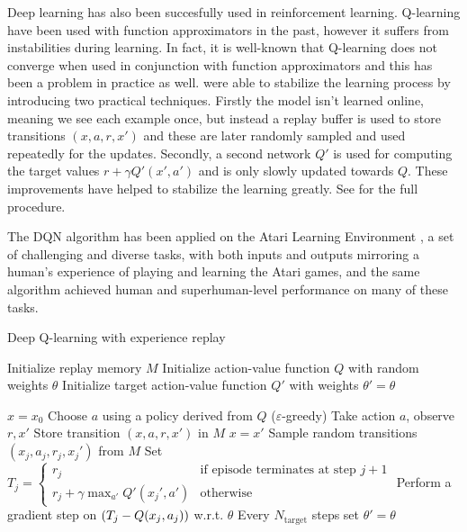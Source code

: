Deep learning has also been succesfully used in reinforcement learning. Q-learning have been used with function approximators in the past\cite{neco}, however it suffers from instabilities during learning. In fact, it is well-known that Q-learning does not converge when used in conjunction with function approximators \cite{...} and this has been a problem in practice as well. \citet{mnih2015human} were able to stabilize the learning process by introducing two practical techniques. Firstly the model isn't learned online, meaning we see each example once, but instead a replay buffer is used to store transitions $(x, a, r, x')$ and these are later randomly sampled and used repeatedly for the updates. Secondly, a second network $Q'$ is used for computing the target values $r + \gamma Q'(x', a')$ and is only slowly updated towards $Q$. These improvements have helped to stabilize the learning greatly. See  for the full procedure.

The DQN algorithm has been applied on the Atari Learning Environment \cite{atari}, a set of challenging and diverse tasks, with both inputs and outputs mirroring a human's experience of playing and learning the Atari games, and the same algorithm achieved human and superhuman-level performance on many of these tasks.

\begin{algorithm}
\caption{Deep Q-learning with experience replay}
\begin{algorithmic}\label{alg:dqn}

    \STATE Initialize replay memory $M$
    \STATE Initialize action-value function $Q$ with random weights $\theta$
    \STATE Initialize target action-value function $Q'$ with weights $\theta'=\theta$

    \STATE $x=x_0$
	\STATE Choose $a$ using a policy derived from $Q$ ($\varepsilon$-greedy)
	\STATE Take action $a$, observe $r, x'$
	\STATE Store transition $(x, a, r, x')$ in $M$
	\STATE $x = x'$
	\STATE Sample random transitions $(x_j, a_j, r_j, x_j')$ from $M$
	\STATE Set $T_j=\begin{cases}
      r_j & \text{if episode terminates at step } j+1\\
      r_j + \gamma \max_{a'} Q'(x_j', a') & \text{otherwise}
    \end{cases}$
    \STATE Perform a gradient step on $\left( {T_j - Q(x_j, a_j)} \right)$ w.r.t. $\theta$
    \STATE Every $N_\text{target}$ steps set $\theta'=\theta$
	\ENDWHILE
	\ENDFOR
	
\end{algorithmic}
\end{algorithm}

